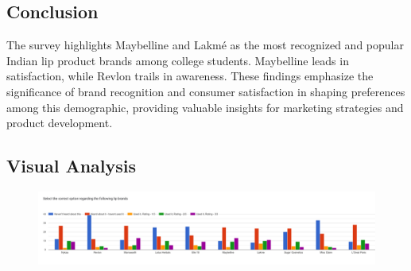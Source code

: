 \documentclass{article}
\begin{document}
\subsection{Conclusion}
The survey highlights Maybelline and Lakmé as the most recognized and popular Indian lip product brands among college students. Maybelline leads in satisfaction, while Revlon trails in awareness. These findings emphasize the significance of brand recognition and consumer satisfaction in shaping preferences among this demographic, providing valuable insights for marketing strategies and product development.

\begin{center}
    \subsection{Visual Analysis}
\end{center}

\begin{figure}[htbp]
    \centering
    \includegraphics[scale=0.114]{../images/survey-graphs/fromgoogle.png}
\end{figure}
\end{document}
